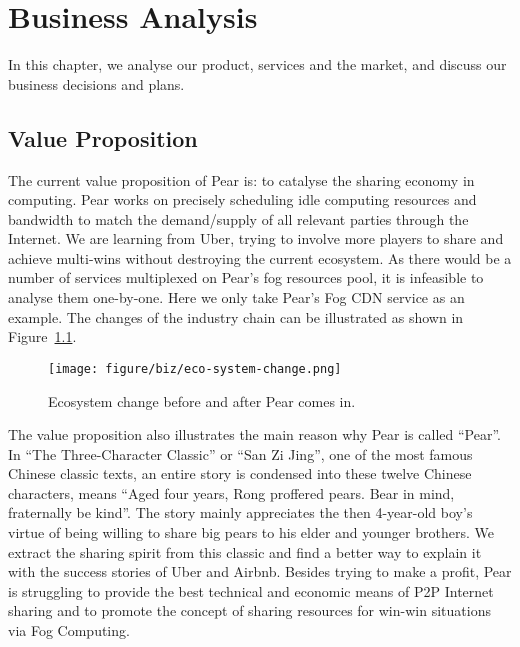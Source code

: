 \chapter{Business Analysis}\label{chp-biz-analysis}
In this chapter, we analyse our product, services and the market, and discuss our business decisions and plans. 

\section{Value Proposition}
The current value proposition of Pear is: to catalyse the sharing economy in computing. Pear works on precisely scheduling idle computing resources and bandwidth to match the demand/supply of all relevant parties through the Internet. We are learning from Uber, trying to involve more players to share and achieve multi-wins without destroying the current ecosystem. As there would be a number of services multiplexed on Pear's fog resources pool, it is infeasible to analyse them one-by-one. Here we only take Pear's Fog CDN service as an example. The changes of the industry chain can be illustrated as shown in Figure~\ref{fig:eco-sys-change}.
\begin{figure}[ht]
	\centering
	\texttt{[image: figure/biz/eco-system-change.png]}
	\caption{Ecosystem change before and after Pear comes in.} \label{fig:eco-sys-change}
\end{figure}

The value proposition also illustrates the main reason why Pear is called ``Pear''. In ``The Three-Character Classic'' or ``San Zi Jing'', one of the most famous Chinese classic texts, an entire story is condensed into these twelve Chinese characters, means ``Aged four years, Rong proffered pears. Bear in mind, fraternally be kind''. The story mainly appreciates the then 4-year-old boy's virtue of being willing to share big pears to his elder and younger brothers. We extract the sharing spirit from this classic and find a better way to explain it with the success stories of Uber and Airbnb. Besides trying to make a profit, Pear is struggling to provide the best technical and economic means of P2P Internet sharing and to promote the concept of sharing resources for win-win situations via Fog Computing. 

